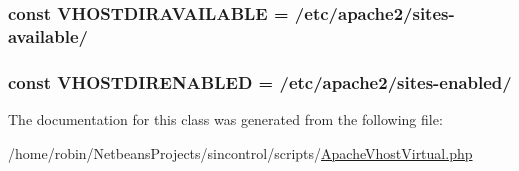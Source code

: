 \subsubsection[{V\+H\+O\+S\+T\+D\+I\+R\+A\+V\+A\+I\+L\+A\+B\+L\+E}]{\setlength{\rightskip}{0pt plus 5cm}const V\+H\+O\+S\+T\+D\+I\+R\+A\+V\+A\+I\+L\+A\+B\+L\+E = \textquotesingle{}/etc/apache2/sites-\/available/\textquotesingle{}}\label{class_apache_vhost_virtual_a2c10c3a25379df4abad5d72bd9d8f50a}
\hypertarget{class_apache_vhost_virtual_a1a4b4a177c5f641247122bc087354252}{}
\subsubsection[{V\+H\+O\+S\+T\+D\+I\+R\+E\+N\+A\+B\+L\+E\+D}]{\setlength{\rightskip}{0pt plus 5cm}const V\+H\+O\+S\+T\+D\+I\+R\+E\+N\+A\+B\+L\+E\+D = \textquotesingle{}/etc/apache2/sites-\/enabled/\textquotesingle{}}\label{class_apache_vhost_virtual_a1a4b4a177c5f641247122bc087354252}


The documentation for this class was generated from the following file\+:\begin{DoxyCompactItemize}
\item 
/home/robin/\+Netbeans\+Projects/sincontrol/scripts/\hyperlink{scripts_2_apache_vhost_virtual_8php}{Apache\+Vhost\+Virtual.\+php}\end{DoxyCompactItemize}
